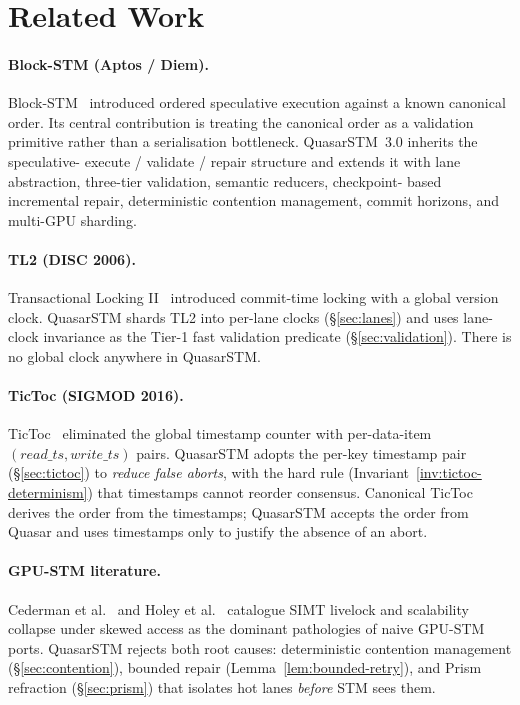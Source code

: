 \section{Related Work}

\label{sec:related}

\paragraph{Block-STM (Aptos / Diem).}
Block-STM~\cite{gelashvili2022blockstm} introduced ordered speculative
execution against a known canonical order. Its central contribution
is treating the canonical order as a validation primitive rather than
a serialisation bottleneck. QuasarSTM~3.0 inherits the speculative-
execute / validate / repair structure and extends it with lane
abstraction, three-tier validation, semantic reducers, checkpoint-
based incremental repair, deterministic contention management, commit
horizons, and multi-GPU sharding.

\paragraph{TL2 (DISC 2006).}
Transactional Locking II~\cite{dice2006tl2} introduced commit-time
locking with a global version clock. QuasarSTM shards TL2 into
per-lane clocks (\S\ref{sec:lanes}) and uses lane-clock invariance as
the Tier-1 fast validation predicate (\S\ref{sec:validation}). There
is no global clock anywhere in QuasarSTM.

\paragraph{TicToc (SIGMOD 2016).}
TicToc~\cite{yu2016tictoc} eliminated the global timestamp counter
with per-data-item $(\mathit{read\_ts}, \mathit{write\_ts})$ pairs.
QuasarSTM adopts the per-key timestamp pair (\S\ref{sec:tictoc}) to
\emph{reduce false aborts}, with the hard rule
(Invariant~\ref{inv:tictoc-determinism}) that timestamps cannot
reorder consensus. Canonical TicToc derives the order from the
timestamps; QuasarSTM accepts the order from Quasar and uses
timestamps only to justify the absence of an abort.

\paragraph{GPU-STM literature.}
Cederman et al.~\cite{cederman2010} and Holey et
al.~\cite{holey2014} catalogue SIMT livelock and scalability collapse
under skewed access as the dominant pathologies of naive GPU-STM
ports. QuasarSTM rejects both root causes: deterministic contention
management (\S\ref{sec:contention}), bounded repair
(Lemma~\ref{lem:bounded-retry}), and Prism refraction
(\S\ref{sec:prism}) that isolates hot lanes \emph{before} STM sees
them.

